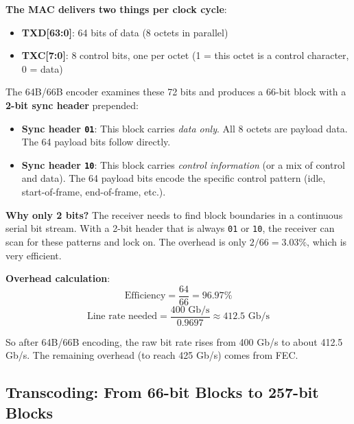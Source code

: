 \documentclass[openany]{tufte-book}
\begin{document}
\textbf{The MAC delivers two things per clock cycle}:
\begin{itemize}
\item \textbf{TXD[63:0]}: 64 bits of data (8 octets in parallel)
\item \textbf{TXC[7:0]}: 8 control bits, one per octet (1 = this octet is a
control character, 0 = data)
\end{itemize}

The 64B/66B encoder examines these 72 bits and produces a 66-bit block with a
\textbf{2-bit sync header} prepended:

\begin{itemize}
\item \textbf{Sync header \texttt{01}}: This block carries \textit{data only}.
All 8 octets are payload data. The 64 payload bits follow directly.
\item \textbf{Sync header \texttt{10}}: This block carries \textit{control
information} (or a mix of control and data). The 64 payload bits encode the
specific control pattern (idle, start-of-frame, end-of-frame, etc.).
\end{itemize}


\textbf{Why only 2 bits?} The receiver needs to find block boundaries in a
continuous serial bit stream. With a 2-bit header that is always \texttt{01}
or \texttt{10}, the receiver can scan for these patterns and lock on. The
overhead is only $2/66 = 3.03\%$, which is very efficient.

\textbf{Overhead calculation}:
\begin{equation}
\text{Efficiency} = \frac{64}{66} = 96.97\%
\end{equation}
\begin{equation}
\text{Line rate needed} = \frac{400 \text{ Gb/s}}{0.9697} \approx 412.5 \text{ Gb/s}
\end{equation}

So after 64B/66B encoding, the raw bit rate rises from 400 Gb/s to about
412.5 Gb/s. The remaining overhead (to reach 425 Gb/s) comes from FEC.

\subsection{Transcoding: From 66-bit Blocks to 257-bit Blocks}
\end{document}
